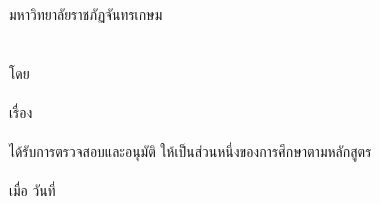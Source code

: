 	{\centering  มหาวิทยาลัยราชภัฏจันทรเกษม\\
	\expandafter\uppercase\expandafter{\@facultyThai}\\[7mm]
	\expandafter\uppercase\expandafter{\@typeofwritingThai}\\[7mm]
	โดย\\[7mm]
	\expandafter\uppercase\expandafter{\@authorThai}\\[7mm]
	เรื่อง\\[7mm]
	\expandafter\uppercase\expandafter{\@thesistitleThai}\\[7mm]
	ได้รับการตรวจสอบและอนุมัติ ให้เป็นส่วนหนึ่งของการศึกษาตามหลักสูตร\\
	\@degreeThai\\[7mm]
	เมื่อ วันที่ \@approvaldate\\[7mm]}
	\vfill
	 \hfill 
	\parbox[t]{0.51\linewidth}{\centering\hrulefill\\\vspace{-2mm}\makebox[\linewidth][c]{(\@chairman)}}\\
	\vfill
	 \hfill 
	\parbox[t]{0.51\linewidth}{\centering\hrulefill\\\vspace{-2mm}\makebox[\linewidth][c]{(\@advisorThai)}}\\
	\ifdefined\@coadvisorThai\vfill
	 \hfill 
	\parbox[t]{0.51\linewidth}{\centering\hrulefill\\\vspace{-2mm}\makebox[\linewidth][c]{(\@coadvisorThai)}}\\\fi
	\ifdefined\@memberone\vfill
	 \hfill 
	\parbox[t]{0.51\linewidth}{\centering\hrulefill\\\vspace{-2mm}\makebox[\linewidth][c]{(\@memberone)}}\\\fi
	\ifdefined\@membertwo\vfill
	 \hfill 
	\parbox[t]{0.51\linewidth}{\centering\hrulefill\\\vspace{-2mm}\makebox[\linewidth][c]{(\@membertwo)}}\\\fi
	\vfill
	 \hfill 
	\parbox[t]{0.51\linewidth}{\centering\hrulefill\\\vspace{-2mm}\makebox[\linewidth][c]{(\@dean)}}
	\ifx\@coadvisorThai\undefined
	\\[5mm]
	\fi
	\ifx\@memberone\undefined
	\\[5mm]
	\fi
	\ifx\@membertwo\undefined
	\\[5mm]
	\fi
	
